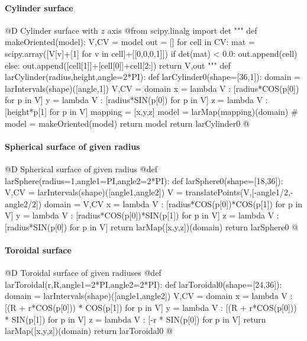 \documentclass[11pt,oneside]{article}	%
\begin{document}
\paragraph{Cylinder surface}
@D Cylinder surface with $z$ axis
@{from scipy.linalg import det
"""
def makeOriented(model):
	V,CV = model
	out = []
	for cell in CV: 
		mat = scipy.array([V[v]+[1] for v in cell]+[[0,0,0,1]])
		if det(mat) < 0.0:
			out.append(cell)
		else:
			out.append([cell[1]]+[cell[0]]+cell[2:])
	return V,out
"""
def larCylinder(radius,height,angle=2*PI):
	def larCylinder0(shape=[36,1]):
		domain = larIntervals(shape)([angle,1])
		V,CV = domain
		x = lambda V : [radius*COS(p[0]) for p in V]
		y = lambda V : [radius*SIN(p[0]) for p in V]
		z = lambda V : [height*p[1] for p in V]
		mapping = [x,y,z]
		model = larMap(mapping)(domain)
		# model = makeOriented(model)
		return model
	return larCylinder0
@}
\paragraph{Spherical surface of given radius}
@D Spherical surface of given radius
@{def larSphere(radius=1,angle1=PI,angle2=2*PI):
	def larSphere0(shape=[18,36]):
		V,CV = larIntervals(shape)([angle1,angle2])
		V = translatePoints(V,[-angle1/2,-angle2/2])
		domain = V,CV
		x = lambda V : [radius*COS(p[0])*COS(p[1]) for p in V]
		y = lambda V : [radius*COS(p[0])*SIN(p[1]) for p in V]
		z = lambda V : [radius*SIN(p[0]) for p in V]
		return larMap([x,y,z])(domain)
	return larSphere0
@}
\paragraph{Toroidal surface}
@D Toroidal surface of given radiuses
@{def larToroidal(r,R,angle1=2*PI,angle2=2*PI):
	def larToroidal0(shape=[24,36]):
		domain = larIntervals(shape)([angle1,angle2])
		V,CV = domain
		x = lambda V : [(R + r*COS(p[0])) * COS(p[1]) for p in V]
		y = lambda V : [(R + r*COS(p[0])) * SIN(p[1]) for p in V]
		z = lambda V : [-r * SIN(p[0]) for p in V]
		return larMap([x,y,z])(domain)
	return larToroidal0
@}
\end{document}

